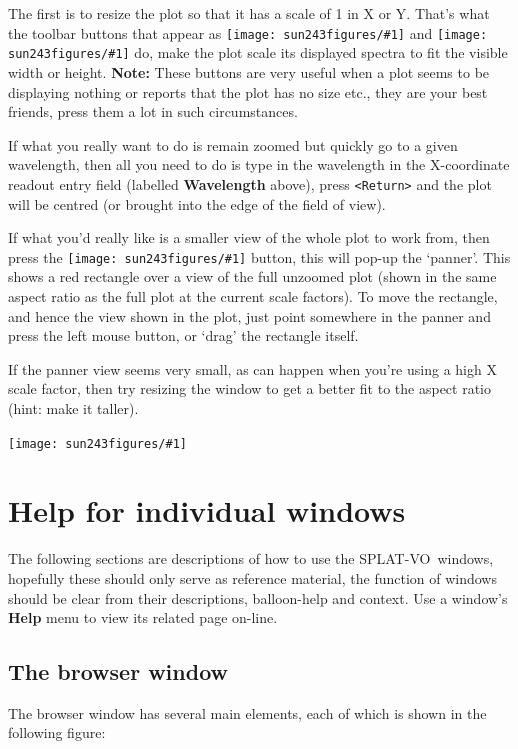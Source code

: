 \documentclass[twoside,11pt]{article}
\newcommand{\htmladdimg}[1]{}
\newcommand{\latexhtml}[2]{#1}
\newcommand{\xlabel}[1]{}
\renewcommand{\_}{\texttt{\symbol{95}}}
\newcommand{\SPLAT}{\textsf{SPLAT-VO}}
\newcommand{\mainfigure}[1]
{\begin{center}
 \latexhtml{\texttt{[image: sun243\_figures/\#1]}}{\htmladdimg{#1.gif}}
 \end{center}
}
\newcommand{\inline}[1]
        {\latexhtml{\texttt{[image: sun243\_figures/\#1]}}
        {\htmladdimg[align=center]{#1.gif}}}
\newcommand{\menuitem}[1]{\textbf{#1}}
\newcommand{\labelitem}[1]{\textbf{#1}}
\newcommand{\hitext}[1]{\texttt{#1}}
\begin{document}
The first is to resize the plot so that it has a scale of 1 in X or
Y. That's what the toolbar buttons that appear as
\inline{fitwidth} and \inline{fitheight} do, make the plot scale its
displayed spectra to fit the visible width or height.
\textbf{Note:} These buttons are very useful when a plot seems to be
displaying nothing or reports that the plot has no size etc., they are your
best friends, press them a lot in such circumstances.

If what you really want to do is remain zoomed but quickly go to a
given wavelength, then all you need to do is type in the wavelength in
the X-coordinate readout entry field (labelled \labelitem{Wavelength}
above), press \hitext{<Return>} and the plot will be centred (or
brought into the edge of the field of view).

If what you'd really like is a smaller view of the whole plot to work
from, then press the \inline{panner} button, this will pop-up the
`panner'. This shows a red rectangle over a view of the full unzoomed
plot (shown in the same aspect ratio as the full plot at the current
scale factors). To move the rectangle, and hence the view shown in the
plot, just point somewhere in the panner and press the left mouse
button, or `drag' the rectangle itself.

If the panner view seems very small, as can happen when you're using a
high X scale factor, then try resizing the window to get a better fit
to the aspect ratio (hint: make it taller).

\mainfigure{pannerwindow}

\section{Help for individual windows\xlabel{help_window_individual}}

The following sections are descriptions of how to use the
\SPLAT\ windows, hopefully these should only serve as reference
material, the function of windows should be clear from their
descriptions, balloon-help and context. Use a window's \menuitem{Help}
menu to view its related page on-line.

\newpage
\subsection{The browser window\xlabel{browser_window}}

The browser window has several main elements, each of which is shown
in the following figure:
\end{document}
